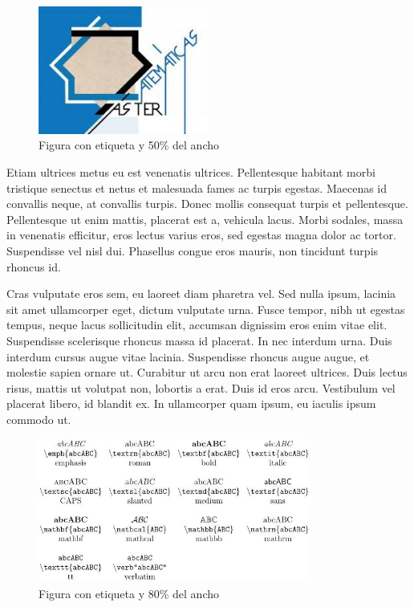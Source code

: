 \documentclass[a4paper,10pt]{article}
\theoremstyle{teorema}
\theoremstyle{plano}
\theoremstyle{titulo}
\begin{document}
\begin{figure}[h]
    \centering
    \includegraphics[width=0.5\textwidth]{imagen1}
    \caption{Figura con etiqueta  y 50\% del ancho}
    \label{fig:master}
\end{figure}

Etiam ultrices metus eu est venenatis ultrices. Pellentesque habitant morbi tristique senectus et netus et malesuada fames ac turpis egestas. Maecenas id convallis neque, at convallis turpis. Donec mollis consequat turpis et pellentesque. Pellentesque ut enim mattis, placerat est a, vehicula lacus. Morbi sodales, massa in venenatis efficitur, eros lectus varius eros, sed egestas magna dolor ac tortor. Suspendisse vel nisl dui. Phasellus congue eros mauris, non tincidunt turpis rhoncus id.

Cras vulputate eros sem, eu laoreet diam pharetra vel. Sed nulla ipsum, lacinia sit amet ullamcorper eget, dictum vulputate urna. Fusce tempor, nibh ut egestas tempus, neque lacus sollicitudin elit, accumsan dignissim eros enim vitae elit. Suspendisse scelerisque rhoncus massa id placerat. In nec interdum urna. Duis interdum cursus augue vitae lacinia. Suspendisse rhoncus augue augue, et molestie sapien ornare ut. Curabitur ut arcu non erat laoreet ultrices. Duis lectus risus, mattis ut volutpat non, lobortis a erat. Duis id eros arcu. Vestibulum vel placerat libero, id blandit ex. In ullamcorper quam ipsum, eu iaculis ipsum commodo ut.

\begin{figure}[t]
    \centering
    \includegraphics[width=0.8\textwidth]{imagen2}
    \caption{Figura con etiqueta  y 80\% del ancho}
    \label{fig:font}
\end{figure}
\end{document}
